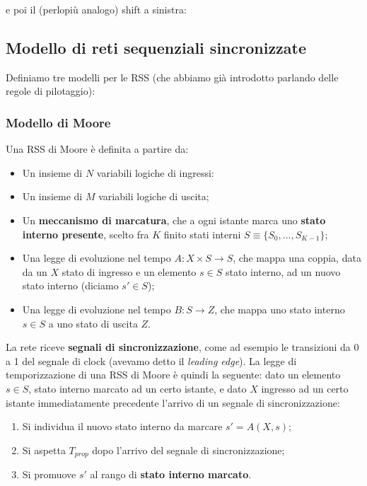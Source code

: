 \documentclass[a4paper,11pt]{article}
\begin{document}


e poi il (perlopiù analogo) shift a sinistra:



\subsection{Modello di reti sequenziali sincronizzate}
Definiamo tre modelli per le RSS (che abbiamo già introdotto parlando delle regole di pilotaggio):

\subsubsection{Modello di Moore}
Una RSS di Moore è definita a partire da:
\begin{itemize}
	\item Un insieme di $N$ variabili logiche di ingressi:
	\item Un insieme di $M$ variabili logiche di uscita;
	\item Un \textbf{meccanismo di marcatura}, che a ogni istante marca uno \textbf{stato interno presente}, scelto fra $K$ finito stati interni $S \equiv \{ S_0, ..., S_{K-1} \}$;
	\item Una legge di evoluzione nel tempo $A: X \times S \rightarrow S$, che mappa una coppia, data da un $X$ stato di ingresso e un elemento $s \in S$ stato interno, ad un nuovo stato interno (diciamo $s' \in S$);
	\item Una legge di evoluzione nel tempo $B:S \rightarrow Z$, che mappa uno stato interno $s \in S$ a uno stato di uscita $Z$.
\end{itemize}

La rete riceve \textbf{segnali di sincronizzazione}, come ad esempio le transizioni da 0 a 1 del segnale di clock (avevamo detto il \textit{leading edge}).
La legge di temporizzazione di una RSS di Moore è quindi la seguente: dato un elemento $s \in S$, stato interno marcato ad un certo istante, e dato $X$ ingresso ad un certo istante immediatamente precedente l'arrivo di un segnale di sincronizzazione:

\begin{enumerate}
	\item Si individua il nuovo stato interno da marcare $s' = A(X, s)$;
	\item Si aspetta $T_{prop}$ dopo l'arrivo del segnale di sincronizzazione;
	\item Si promuove $s'$ al rango di \textbf{stato interno marcato}.
\end{enumerate}
\end{document}
